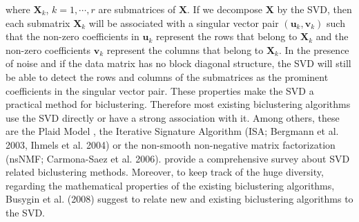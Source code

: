 where $\mathbf{X}_{k}$, $k=1,\cdots,r$ are submatrices of $\mathbf{X}$. If we decompose $\mathbf{X}$ by the SVD, then each submatrix $\mathbf{X}_{k}$ will be associated with a singular vector pair $(\mathbf{u}_{k},\mathbf{v}_{k})$ such that the non-zero coefficients in $\mathbf{u}_{k}$ represent the rows that belong to $\mathbf{X}_{k}$ and the non-zero coefficients $\mathbf{v}_{k}$ represent the columns that belong to $\mathbf{X}_{k}$. In the presence of noise and if the data matrix has no block diagonal structure, the SVD will still be able to detect the rows and columns of the submatrices as the prominent coefficients in the singular vector pair. These properties make the SVD a practical method for biclustering. Therefore most existing biclustering algorithms use the SVD directly or have a strong association with it. Among others, these are the Plaid Model \cite{Lazzeroni2000}, the Iterative Signature Algorithm (ISA; Bergmann et al. 2003, Ihmels et al. 2004) or the non-smooth non-negative matrix factorization (nsNMF; Carmona-Saez et al. 2006). \citet{Busygin2008} provide a comprehensive survey about SVD related biclustering methods. Moreover, to keep track of the huge diversity, regarding the mathematical properties of the existing biclustering algorithms, Busygin et al. (2008) suggest to relate new and existing biclustering algorithms to the SVD. 
    

